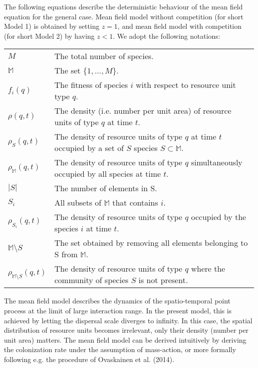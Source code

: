 \documentclass[8pt,a4paper]{article}
\begin{document}
The following equations describe the deterministic behaviour of the mean field equation for the general case. Mean field model without competition (for short Model 1) is obtained by setting $z=1$, and mean field model with competition (for short Model 2) by having $z<1$. We adopt  the following notations:

\begin{tabular}{ll}
$M$ & The total number of species. \\
$\mathbb{M}$ & The set $\{1,\ldots, M\}.$\\
$f_i (q)$ & The fitness of species $i$ with respect to resource unit type $q$. \\
$\rho(q,t)$ & The density (i.e. number per unit area) of resource units of type   $q$ at time $t$. \\
$\rho_S (q,t)$ & The density of resource units of type $q$ at time $t$ occupied by a set of  $ S$ species $S \subset \mathbb{M}$.\\
$\rho_{\mathbb{M}}(q,t)$ & The density of resource units of type $q$ simultaneously occupied by all species at time $t.$ \\
$|S|$ & The number of elements in S. \\
$S_i$ & All subsets of $\mathbb{M}$ that contains $i.$\\
$\rho_{S_i}(q,t)$ & The density of resource units of type $q$ occupied by the species $i$ at time $t.$ \\
$\mathbb{M}\setminus{S}$ & The set obtained by removing all elements belonging to S from $\mathbb{M}.$\\
$\rho_{\mathbb{M}\setminus{S}}(q,t)$ & The density of resource units of type $q$ where the community of species $S$ is not present. 
\end{tabular}
\vspace{0.6 cm}

The mean field model describes the dynamics of the spatio-temporal point process at the limit of large interaction range. In the present model, this is achieved by letting the dispersal scale diverges to infinity. In this case, the spatial distribution of resource units becomes irrelevant, only their density (number per unit area) matters. The mean field model can be derived intuitively by deriving the colonization rate under the assumption of mass-action, or more formally following e.g. the procedure of Ovaskainen et al. (2014).
\end{document}
